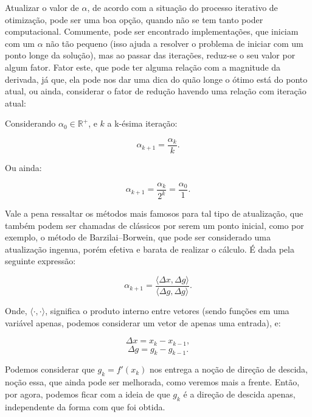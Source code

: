 Atualizar o valor de \(\alpha\), de acordo com a situação do processo iterativo
de otimização, pode ser uma boa opção, quando não se tem tanto poder
computacional. Comumente, pode ser encontrado implementações, que iniciam
com um \(\alpha\) não tão pequeno (isso ajuda a resolver o problema de
iniciar com um ponto longe da solução), mas ao passar das iterações,
reduz-se o seu valor por algum fator. Fator este, que pode ter alguma relação
com a magnitude da derivada, já que, ela pode nos dar uma dica do quão longe
o ótimo está do ponto atual, ou ainda, considerar o fator de redução havendo
uma relação com iteração atual:


Considerando \(\alpha_{0} \in \mathbb{R}^{+}  \), e \(k\) a k-ésima iteração:

\begin{equation}
    \alpha_{k+1} = \frac{\alpha_{k}}{k}.
\end{equation}

Ou ainda:

\begin{equation}
    \alpha_{k+1} = \frac{\alpha_{k}}{2^k} = \frac{\alpha_{0}}{1}.
\end{equation}

Vale a pena ressaltar os métodos mais famosos para tal tipo de atualização,
que também podem ser chamadas de clássicos por serem um ponto inicial, como por
exemplo, o método de Barzilai–Borwein, que pode ser considerado uma atualização
ingenua, porém efetiva e barata de realizar o cálculo. É dada pela seguinte expressão:

\begin{equation}
    \alpha_{k+1} = \frac{\langle \Delta x, \Delta g \rangle}{\langle \Delta g, \Delta g \rangle}.
\end{equation}

Onde, \( \langle \cdot, \cdot \rangle \), significa o produto interno entre
vetores (sendo funções em uma variável apenas, podemos considerar um vetor de
apenas uma entrada), e:

\begin{equation}
    \Delta x = x_k - x_{k-1},
\end{equation}
\begin{equation}
    \Delta g = g_k - g_{k-1}.
\end{equation}


Podemos considerar que \(g_k = f'(x_k) \) nos entrega a noção de direção de
descida, noção essa, que ainda pode ser melhorada, como veremos mais a frente.
Então, por agora, podemos ficar com a ideia de que \(g_k\) é a direção de
descida apenas, independente da forma com que foi obtida.

